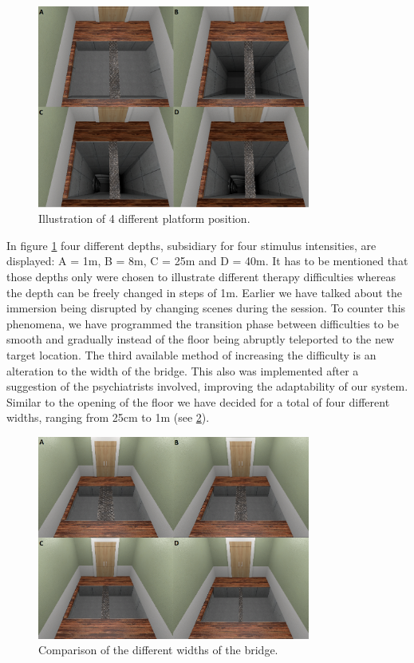 \begin{figure}[H]
\centering
\includegraphics[width=0.8\textwidth]{images/DepthComparison.png}
\caption{Illustration of 4 different platform position.}
\label{DepthImg}
\end{figure}

In figure \ref{DepthImg} four different depths, subsidiary for four stimulus intensities, are displayed: A = 1m, B = 8m, C = 25m and D = 40m. It has to be mentioned that those depths only were chosen to illustrate different therapy difficulties whereas the depth can be freely changed in steps of 1m. Earlier we have talked about the immersion being disrupted by changing scenes during the session. To counter this phenomena, we have programmed the transition phase between difficulties to be smooth and gradually instead of the floor being abruptly teleported to the new target location. 
The third available method of increasing the difficulty is an alteration to the width of the bridge. This also was implemented after a suggestion of the psychiatrists involved, improving the adaptability of our system. Similar to the opening of the floor we have decided for a total of four different widths, ranging from 25cm to 1m (see \ref{BridgeImg}).

\begin{figure}[H]
\centering
\includegraphics[width=0.8\textwidth]{images/BridgeComparison.png}
\caption{Comparison of the different widths of the bridge.}
\label{BridgeImg}
\end{figure}

